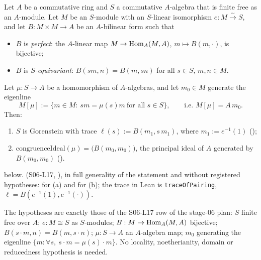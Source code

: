 \begin{proposition}\label{prop:s04-etaprinciple}
Let $A$ be a commutative ring and $S$ a commutative $A$-algebra that is finite free as an $A$-module. Let $M$ be an $S$-module with an
$S$-linear isomorphism $e:M\xrightarrow{\sim}S$, and let $B:M\times M\to A$ be an $A$-bilinear form such that
\begin{itemize}
\item $B$ is \emph{perfect}: the $A$-linear map $M\to\operatorname{Hom}_A(M,A)$, $m\mapsto B(m,\cdot)$, is bijective;
\item $B$ is \emph{$S$-equivariant}: $B(sm,n)=B(m,sn)$ for all $s\in S$, $m,n\in M$.
\end{itemize}
Let $\mu:S\to A$ be a homomorphism of $A$-algebras, and let $m_0\in M$ generate the eigenline
\[M[\mu]:=\{m\in M:\ sm=\mu(s)m\ \text{for all }s\in S\},\qquad\text{i.e.\ }M[\mu]=A\,m_0.\]
Then:
\begin{enumerate}[label=(\alph*)]
\item $S$ is Gorenstein with trace $\ell(s):=B(m_1,s\,m_1)$, where $m_1:=e^{-1}(1)$ ();
\item $\mathrm{congruenceIdeal}(\mu)=\big(B(m_0,m_0)\big)$, the principal ideal of $A$ generated by $B(m_0,m_0)$
  ().
\end{enumerate}
\stproved{} below. \stformal{} (S06-L17, ), in full generality of the statement and without registered hypotheses:  for (a) and  for (b); the trace in Lean is \texttt{traceOfPairing}, $\ell=B(e^{-1}(1),e^{-1}(\cdot))$.
\end{proposition}
\noindent The hypotheses are exactly those of the S06-L17 row of the stage-06 plan: $S$ finite free over $A$; $e:M\cong S$ as
$S$-modules; $B:M\to\operatorname{Hom}_A(M,A)$ bijective; $B(s\cdot m,n)=B(m,s\cdot n)$; $\mu:S\to A$ an $A$-algebra map; $m_0$ generating the
eigenline $\{m:\forall s,\ s\cdot m=\mu(s)\cdot m\}$. No locality, noetherianity, domain or reducedness hypothesis is needed.

